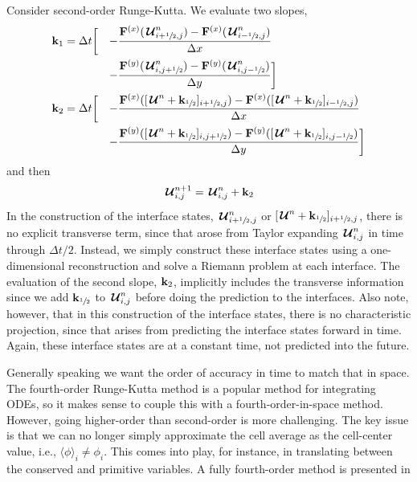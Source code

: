 Consider
second-order Runge-Kutta.  We evaluate two slopes,
\begin{alignat}{3}
{\bf k}_1 &= \Delta t \bigg [ &-&\frac{{\bf F}^{(x)}({\,\boldsymbol{\mathcal{U}}}^n_{i+{\sfrac{1}{2}},j})
                               - {\bf F}^{(x)}({\,\boldsymbol{\mathcal{U}}}^n_{i-{\sfrac{1}{2}},j})}{\Delta x} \nonumber \\
    &\,                 &-&\frac{{\bf F}^{(y)}({\,\boldsymbol{\mathcal{U}}}^n_{i,j+{\sfrac{1}{2}}})
                               - {\bf F}^{(y)}({\,\boldsymbol{\mathcal{U}}}^n_{i,j-{\sfrac{1}{2}}})}{\Delta y} \bigg ] \\
{\bf k}_2 &= \Delta t \bigg [ &-&\frac{{\bf F}^{(x)}([{\,\boldsymbol{\mathcal{U}}}^n + {\bf k}_{\sfrac{1}{2}}]_{i+{\sfrac{1}{2}},j})
                               - {\bf F}^{(x)}([{\,\boldsymbol{\mathcal{U}}}^n + {\bf k}_{\sfrac{1}{2}}]_{i-{\sfrac{1}{2}},j})}{\Delta x} \nonumber \\
    &\,                 &-&\frac{{\bf F}^{(y)}([{\,\boldsymbol{\mathcal{U}}}^n + {\bf k}_{\sfrac{1}{2}}]_{i,j+{\sfrac{1}{2}}})
                               - {\bf F}^{(y)}([{\,\boldsymbol{\mathcal{U}}}^n + {\bf k}_{\sfrac{1}{2}}]_{i,j-{\sfrac{1}{2}}})}{\Delta y} \bigg ]
\end{alignat}
and then
\begin{equation}
{\,\boldsymbol{\mathcal{U}}}^{n+1}_{i,j} = {\,\boldsymbol{\mathcal{U}}}^n_{i,j} + {\bf k}_2
\end{equation}
In the construction of the interface states, ${\,\boldsymbol{\mathcal{U}}}^n_{i+{\sfrac{1}{2}},j}$ or $[{\,\boldsymbol{\mathcal{U}}}^n
+ {\bf k}_{\sfrac{1}{2}}]_{i+{\sfrac{1}{2}},j}$, there is no explicit transverse term, since that
arose from Taylor expanding ${\,\boldsymbol{\mathcal{U}}}^n_{i,j}$ in time through $\Delta t/2$.
Instead, we simply construct these interface states using a
one-dimensional reconstruction and solve a Riemann problem at each
interface.  The evaluation of the second slope, ${\bf k}_2$, implicitly
includes the transverse information since we add ${\bf k}_{\sfrac{1}{2}}$ to
${\,\boldsymbol{\mathcal{U}}}^n_{i,j}$ before doing the prediction to the interfaces.  Also note,
however, that in this construction of the interface states, there is
no characteristic projection, since that arises from predicting the
interface states forward in time.  Again, these interface states are
at a constant time, not predicted into the future.

Generally speaking we want the order of accuracy in time to match that
in space.  The fourth-order Runge-Kutta method is a popular method for
integrating ODEs, so it makes sense to couple this with a
fourth-order-in-space method.  However, going higher-order than
second-order is more challenging.  The key issue is that we can no
longer simply approximate the cell average as the cell-center value,
i.e., $\langle \phi\rangle_i \ne \phi_i$.  This comes into play, for
instance, in translating between the conserved and primitive variables.
A fully fourth-order method is presented in ~\cite{mccorquodalecolella}

